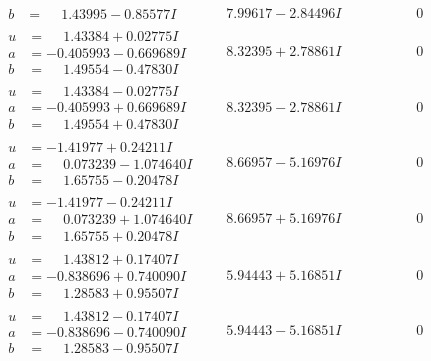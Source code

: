 \documentclass[1p]{elsarticle_modified}
\theoremstyle{definition}
\begin{document}
$$\begin{array}{c|c|c}
\begin{aligned}
b &= \phantom{-}1.43995 - 0.85577 I\end{aligned}
 & \phantom{-}7.99617 - 2.84496 I & \phantom{-0.000000 } 0 \\ \hline\begin{aligned}
u &= \phantom{-}1.43384 + 0.02775 I \\
a &= -0.405993 - 0.669689 I \\
b &= \phantom{-}1.49554 - 0.47830 I\end{aligned}
 & \phantom{-}8.32395 + 2.78861 I & \phantom{-0.000000 } 0 \\ \hline\begin{aligned}
u &= \phantom{-}1.43384 - 0.02775 I \\
a &= -0.405993 + 0.669689 I \\
b &= \phantom{-}1.49554 + 0.47830 I\end{aligned}
 & \phantom{-}8.32395 - 2.78861 I & \phantom{-0.000000 } 0 \\ \hline\begin{aligned}
u &= -1.41977 + 0.24211 I \\
a &= \phantom{-}0.073239 - 1.074640 I \\
b &= \phantom{-}1.65755 - 0.20478 I\end{aligned}
 & \phantom{-}8.66957 - 5.16976 I & \phantom{-0.000000 } 0 \\ \hline\begin{aligned}
u &= -1.41977 - 0.24211 I \\
a &= \phantom{-}0.073239 + 1.074640 I \\
b &= \phantom{-}1.65755 + 0.20478 I\end{aligned}
 & \phantom{-}8.66957 + 5.16976 I & \phantom{-0.000000 } 0 \\ \hline\begin{aligned}
u &= \phantom{-}1.43812 + 0.17407 I \\
a &= -0.838696 + 0.740090 I \\
b &= \phantom{-}1.28583 + 0.95507 I\end{aligned}
 & \phantom{-}5.94443 + 5.16851 I & \phantom{-0.000000 } 0 \\ \hline\begin{aligned}
u &= \phantom{-}1.43812 - 0.17407 I \\
a &= -0.838696 - 0.740090 I \\
b &= \phantom{-}1.28583 - 0.95507 I\end{aligned}
 & \phantom{-}5.94443 - 5.16851 I & \phantom{-0.000000 } 0 \\ \hline\begin{aligned}

\end{aligned}
\end{array}$$
\end{document}
